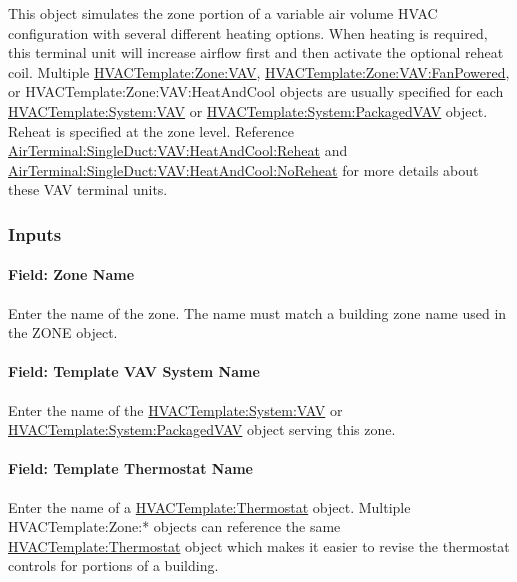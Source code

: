 This object simulates the zone portion of a variable air volume HVAC configuration with several different heating options. When heating is required, this terminal unit will increase airflow first and then activate the optional reheat coil. Multiple \hyperref[hvactemplatezonevav]{HVACTemplate:Zone:VAV}, \hyperref[hvactemplatezonevavfanpowered]{HVACTemplate:Zone:VAV:FanPowered}, or HVACTemplate:Zone:VAV:HeatAndCool objects are usually specified for each \hyperref[hvactemplatesystemvav]{HVACTemplate:System:VAV} or \hyperref[hvactemplatesystempackagedvav]{HVACTemplate:System:PackagedVAV} object. Reheat is specified at the zone level. Reference \hyperref[airterminalsingleductvavheatandcoolreheat]{AirTerminal:SingleDuct:VAV:HeatAndCool:Reheat} and \hyperref[airterminalsingleductvavheatandcoolnoreheat]{AirTerminal:SingleDuct:VAV:HeatAndCool:NoReheat} for more details about these VAV terminal units.

\subsubsection{Inputs}\label{inputs-11-006}

\paragraph{Field: Zone Name}\label{field-zone-name-10}

Enter the name of the zone. The name must match a building zone name used in the ZONE object.

\paragraph{Field: Template VAV System Name}\label{field-template-vav-system-name-2}

Enter the name of the \hyperref[hvactemplatesystemvav]{HVACTemplate:System:VAV} or \hyperref[hvactemplatesystempackagedvav]{HVACTemplate:System:PackagedVAV} object serving this zone.

\paragraph{Field: Template Thermostat Name}\label{field-template-thermostat-name-10}

Enter the name of a \hyperref[hvactemplatethermostat]{HVACTemplate:Thermostat} object. Multiple HVACTemplate:Zone:* objects can reference the same \hyperref[hvactemplatethermostat]{HVACTemplate:Thermostat} object which makes it easier to revise the thermostat controls for portions of a building.


